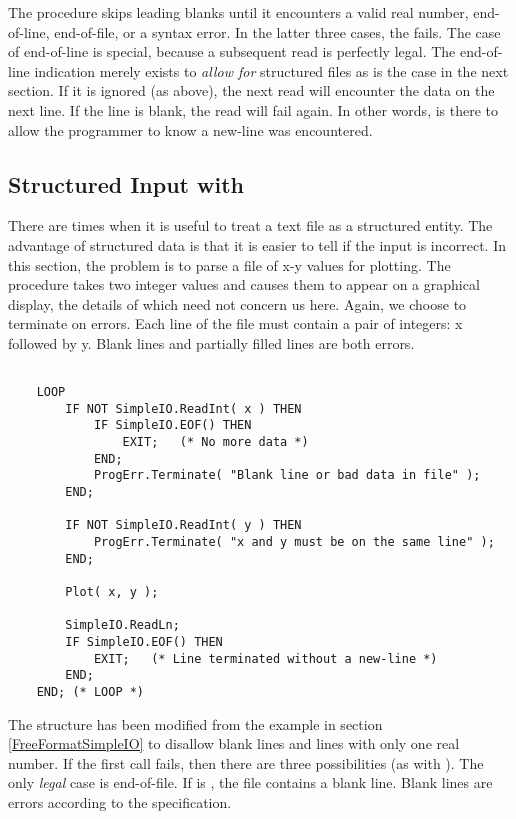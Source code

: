 The procedure  skips leading blanks until
it encounters a valid real number, end-of-line, end-of-file, or a syntax
error.  In
the latter three cases, the  fails.  The case of
end-of-line is special, because a subsequent read is perfectly legal.
The end-of-line indication merely exists to {\em allow for} structured
files as is the case in the next section.  If it is ignored (as
above), the next read will encounter the data on the next line.
If the line is blank, the read will fail again.  In other words,
 is there to allow the programmer to 
know a new-line was encountered.

\subsection{Structured Input with }

There are times when it is useful to treat a text file as a structured
entity. 
The advantage of structured data is that it is easier to tell if the
input is incorrect.  In this section, the problem is to parse a file
of x-y values for plotting.  The procedure  takes two
integer values and causes them to appear on a graphical display, the
details of which need not concern us here.  Again, we choose to
terminate on errors.  Each line of the file must contain a pair
of integers: x followed by y.
Blank lines and partially filled lines are both errors.
\begin{verbatim}

    LOOP
        IF NOT SimpleIO.ReadInt( x ) THEN
            IF SimpleIO.EOF() THEN
                EXIT;   (* No more data *)
            END;
            ProgErr.Terminate( "Blank line or bad data in file" );
        END;
        
        IF NOT SimpleIO.ReadInt( y ) THEN
            ProgErr.Terminate( "x and y must be on the same line" );
        END;
        
        Plot( x, y );
        
        SimpleIO.ReadLn;
        IF SimpleIO.EOF() THEN
            EXIT;   (* Line terminated without a new-line *)
        END;
    END; (* LOOP *)
\end{verbatim}
    
The structure has been modified from the example in section 
\ref{FreeFormatSimpleIO} to disallow blank lines and lines
with only one real number.  
If the first  call fails, then there
are three possibilities (as with ).  The only
{\em legal} case is end-of-file.  If  is ,
the file contains a blank line.  Blank lines are errors according
to the specification.

